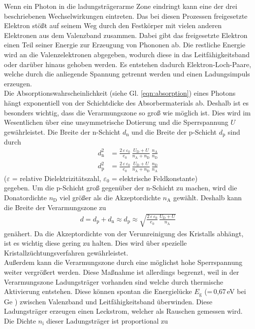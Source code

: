 Wenn ein Photon in die ladungsträgerarme Zone eindringt kann eine der drei beschriebenen Wechselwirkungen eintreten. Das bei diesen Prozessen freigesetzte Elektron stößt auf seinem Weg durch den Festkörper mit vielen anderen Elektronen aus dem Valenzband zusammen. Dabei gibt das freigesetzte Elektron einen Teil seiner Energie zur Erzeugung von Phononen ab. Die restliche Energie wird an die Valenzelektronen abgegeben, wodurch diese in das Leitfähigkeitsband oder darüber hinaus gehoben werden. Es entstehen dadurch Elektron-Loch-Paare, welche durch die anliegende Spannung getrennt werden und einen Ladungsimpuls erzeugen. \\
Die Absorptionswahrscheinlichkeit (siehe Gl. \eqref{eqn:absorption}) eines Photons hängt exponentiell von der Schichtdicke des Absorbermaterials ab. Deshalb ist es besonders wichtig, dass die Verarmungszone so groß wie möglich ist. Dies wird im Wesentlichen über eine unsymmetrische Dotierung und die Sperrspannung $U$ gewährleistet. Die Breite der n-Schicht $d_\text{n}$ und die Breite der p-Schicht $d_\text{p}$ sind durch
\begin{align}
	d_\text{n}^2 &= \frac{2\,\varepsilon\,\varepsilon_0} {e_0} \, \frac{U_\text{D} + U}{n_\text{A} + n_\text{D}} \, \frac{n_\text{A}}{n_\text{D}} \\
	d_\text{p}^2 &= \frac{2\,\varepsilon\,\varepsilon_0} {e_0} \, \frac{U_\text{D} + U} {n_\text{A} + n_\text{D}} \, \frac{n_\text{D}}{n_\text{A}}
\end{align}
\hfil {\footnotesize($\varepsilon$ = relative Dielektrizitätszahl, $\varepsilon_0$ = elektrische Feldkonstante)} \hfil \\
gegeben. Um die p-Schicht groß gegenüber der n-Schicht zu machen, wird die Donatordichte $n_\text{D}$ viel größer als die Akzeptordichte $n_\text{A}$ gewählt. Deshalb kann die Breite der Verarmungszone zu
\begin{align}
	d = d_\text{p} + d_\text{n} \approx d_\text{p} \approx \sqrt{\frac{2\,\varepsilon\,\varepsilon_0} {e_0} \, \frac{U_\text{D} + U}{n_\text{A}}}
\end{align}
genähert. Da die Akzeptordichte von der Verunreinigung des Kristalls abhängt, ist es wichtig diese gering zu halten. Dies wird über spezielle Kristallzüchtungsverfahren gewährleistet. \\
Außerdem kann die Verarmungszone durch eine möglichst hohe Sperrspannung weiter vergrößert werden. Diese Maßnahme ist allerdings begrenzt, weil in der Verarmungszone Ladungsträger vorhanden sind welche durch thermische Aktivierung entstehen. Diese können spontan die Energielücke $E_\text{g}$ (=\,0,67\,eV bei Ge \cite[13]{V18}) zwischen Valenzband und Leitfähigkeitsband überwinden. Diese Ladungsträger erzeugen einen Leckstrom, welcher als Rauschen gemessen wird. Die Dichte $n_\text{i}$ dieser Ladungsträger ist proportional zu
